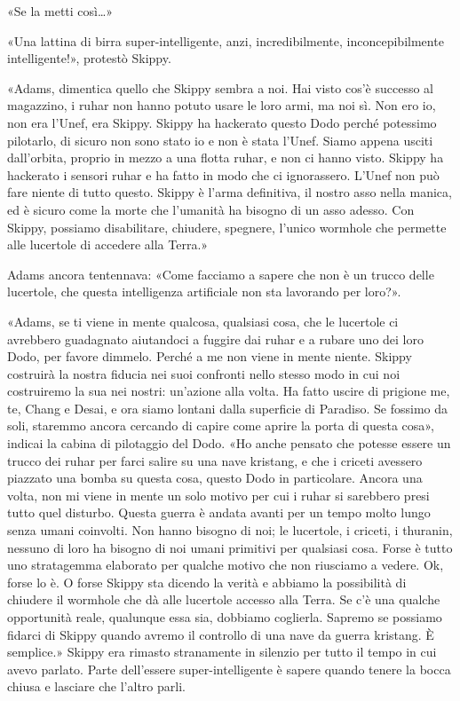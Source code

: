 «Se la metti così\ldots»

«Una lattina di birra super-intelligente, anzi, incredibilmente,
inconcepibilmente intelligente!», protestò Skippy.

«Adams, dimentica quello che Skippy sembra a noi. Hai visto cos'è
successo al magazzino, i ruhar non hanno potuto usare le loro armi, ma
noi sì. Non ero io, non era l'Unef, era Skippy. Skippy ha hackerato
questo Dodo perché potessimo pilotarlo, di sicuro non sono stato io e
non è stata l'Unef. Siamo appena usciti dall'orbita, proprio in mezzo a
una flotta ruhar, e non ci hanno visto. Skippy ha hackerato i sensori
ruhar e ha fatto in modo che ci ignorassero. L'Unef non può fare niente
di tutto questo. Skippy è l'arma definitiva, il nostro asso nella
manica, ed è sicuro come la morte che l'umanità ha bisogno di un asso
adesso. Con Skippy, possiamo disabilitare, chiudere, spegnere, l'unico
wormhole che permette alle lucertole di accedere alla Terra.»

Adams ancora tentennava: «Come facciamo a sapere che non è un trucco
delle lucertole, che questa intelligenza artificiale non sta lavorando
per loro?».

«Adams, se ti viene in mente qualcosa, qualsiasi cosa, che le lucertole
ci avrebbero guadagnato aiutandoci a fuggire dai ruhar e a rubare uno
dei loro Dodo, per favore dimmelo. Perché a me non viene in mente
niente. Skippy costruirà la nostra fiducia nei suoi confronti nello
stesso modo in cui noi costruiremo la sua nei nostri: un'azione alla
volta. Ha fatto uscire di prigione me, te, Chang e Desai, e ora siamo
lontani dalla superficie di Paradiso. Se fossimo da soli, staremmo
ancora cercando di capire come aprire la porta di questa cosa», indicai
la cabina di pilotaggio del Dodo. «Ho anche pensato che potesse essere
un trucco dei ruhar per farci salire su una nave kristang, e che i
criceti avessero piazzato una bomba su questa cosa, questo Dodo in
particolare. Ancora una volta, non mi viene in mente un solo motivo per
cui i ruhar si sarebbero presi tutto quel disturbo. Questa guerra è
andata avanti per un tempo molto lungo senza umani coinvolti. Non hanno
bisogno di noi; le lucertole, i criceti, i thuranin, nessuno di loro ha
bisogno di noi umani primitivi per qualsiasi cosa. Forse è tutto uno
stratagemma elaborato per qualche motivo che non riusciamo a vedere. Ok,
forse lo è. O forse Skippy sta dicendo la verità e abbiamo la
possibilità di chiudere il wormhole che dà alle lucertole accesso alla
Terra. Se c'è una qualche opportunità reale, qualunque essa sia,
dobbiamo coglierla. Sapremo se possiamo fidarci di Skippy quando avremo
il controllo di una nave da guerra kristang. È semplice.» Skippy era
rimasto stranamente in silenzio per tutto il tempo in cui avevo parlato.
Parte dell'essere super-intelligente è sapere quando tenere la bocca
chiusa e lasciare che l'altro parli.

